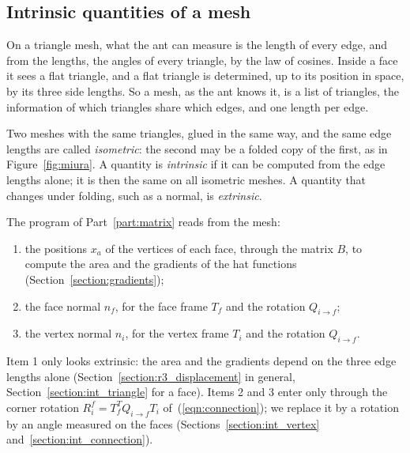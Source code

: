 \subsection{Intrinsic quantities of a mesh}

On a triangle mesh, what the ant can measure is the length of every edge, and from the lengths, the angles of every triangle, by the law of cosines. Inside a face it sees a flat triangle, and a flat triangle is determined, up to its position in space, by its three side lengths. So a mesh, as the ant knows it, is a list of triangles, the information of which triangles share which edges, and one length per edge.

Two meshes with the same triangles, glued in the same way, and the same edge lengths are called \emph{isometric}: the second may be a folded copy of the first, as in Figure~\ref{fig:miura}. A quantity is \emph{intrinsic} if it can be computed from the edge lengths alone; it is then the same on all isometric meshes. A quantity that changes under folding, such as a normal, is \emph{extrinsic}.

The program of Part~\ref{part:matrix} reads from the mesh:
\begin{enumerate}
\item the positions $x_a$ of the vertices of each face, through the matrix $B$, to compute the area and the gradients of the hat functions (Section~\ref{section:gradients});
\item the face normal $n_f$, for the face frame $T_f$ and the rotation $Q_{i \to f}$;
\item the vertex normal $n_i$, for the vertex frame $T_i$ and the rotation $Q_{i \to f}$.
\end{enumerate}
Item 1 only looks extrinsic: the area and the gradients depend on the three edge lengths alone (Section~\ref{section:r3_displacement} in general, Section~\ref{section:int_triangle} for a face). Items 2 and 3 enter only through the corner rotation $R_i^f = T_f^TQ_{i\to f}T_i$ of~(\ref{eqn:connection}); we replace it by a rotation by an angle measured on the faces (Sections~\ref{section:int_vertex} and~\ref{section:int_connection}).

